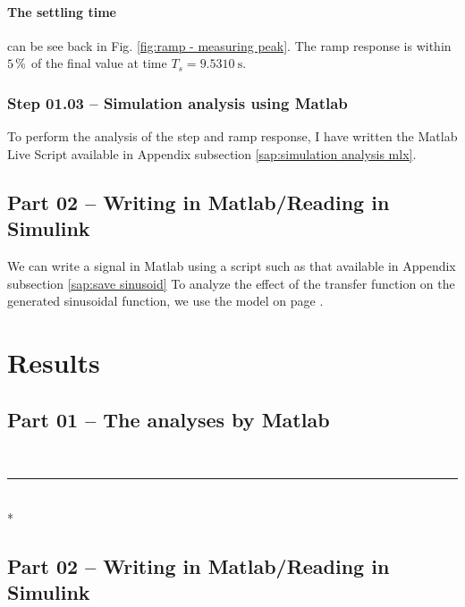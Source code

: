 \documentclass[12pt]{article}
\def\hr{{\par\noindent\rule{\textwidth}{0.4pt}}}
\begin{document}
\paragraph{The settling time} can be see back in Fig. \ref{fig:ramp - measuring peak}.
The ramp response is within $\SI5\percent$ of the final value at time $T_s = \SI{9.5310}\second$.

\subsubsection{Step 01.03 -- Simulation analysis using Matlab}

To perform the analysis of the step and ramp response,
I have written the Matlab Live Script available in Appendix subsection \ref{sap:simulation analysis mlx}.

\subsection{Part 02 -- Writing in Matlab/Reading in Simulink}

We can write a signal in Matlab using a script such as that available in Appendix subsection \ref{sap:save sinusoid}
To analyze the effect of the transfer function on the generated sinusoidal function,
we use the model on page \pageref{pdf:part02}.



\section{Results}

\subsection{Part 01 -- The analyses by Matlab}



\ \hr \\*



\subsection{Part 02 -- Writing in Matlab/Reading in Simulink}


\end{document}
